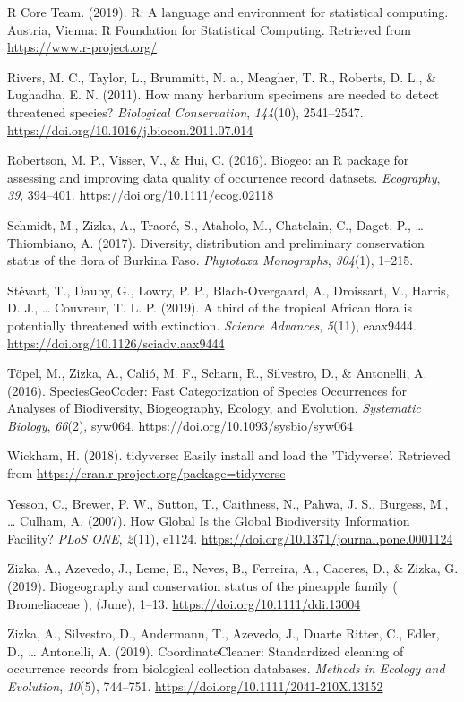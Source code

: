 \documentclass[
  12pt,
]{article}
\begin{document}
\leavevmode\hypertarget{ref-rcoreteam2019}{}%
R Core Team. (2019). R: A language and environment for statistical computing. Austria, Vienna: R Foundation for Statistical Computing. Retrieved from \url{https://www.r-project.org/}

\leavevmode\hypertarget{ref-Rivers2011}{}%
Rivers, M. C., Taylor, L., Brummitt, N. a., Meagher, T. R., Roberts, D. L., \& Lughadha, E. N. (2011). How many herbarium specimens are needed to detect threatened species? \emph{Biological Conservation}, \emph{144}(10), 2541--2547. \url{https://doi.org/10.1016/j.biocon.2011.07.014}

\leavevmode\hypertarget{ref-Robertson2016}{}%
Robertson, M. P., Visser, V., \& Hui, C. (2016). Biogeo: an R package for assessing and improving data quality of occurrence record datasets. \emph{Ecography}, \emph{39}, 394--401. \url{https://doi.org/10.1111/ecog.02118}

\leavevmode\hypertarget{ref-Schmidt2017}{}%
Schmidt, M., Zizka, A., Traoré, S., Ataholo, M., Chatelain, C., Daget, P., \ldots{} Thiombiano, A. (2017). Diversity, distribution and preliminary conservation status of the flora of Burkina Faso. \emph{Phytotaxa Monographs}, \emph{304}(1), 1--215.

\leavevmode\hypertarget{ref-Stevart2019}{}%
Stévart, T., Dauby, G., Lowry, P. P., Blach-Overgaard, A., Droissart, V., Harris, D. J., \ldots{} Couvreur, T. L. P. (2019). A third of the tropical African flora is potentially threatened with extinction. \emph{Science Advances}, \emph{5}(11), eaax9444. \url{https://doi.org/10.1126/sciadv.aax9444}

\leavevmode\hypertarget{ref-Topel2016}{}%
Töpel, M., Zizka, A., Calió, M. F., Scharn, R., Silvestro, D., \& Antonelli, A. (2016). SpeciesGeoCoder: Fast Categorization of Species Occurrences for Analyses of Biodiversity, Biogeography, Ecology, and Evolution. \emph{Systematic Biology}, \emph{66}(2), syw064. \url{https://doi.org/10.1093/sysbio/syw064}

\leavevmode\hypertarget{ref-Wickham2018}{}%
Wickham, H. (2018). tidyverse: Easily install and load the 'Tidyverse'. Retrieved from \url{https://cran.r-project.org/package=tidyverse}

\leavevmode\hypertarget{ref-Yesson2007}{}%
Yesson, C., Brewer, P. W., Sutton, T., Caithness, N., Pahwa, J. S., Burgess, M., \ldots{} Culham, A. (2007). How Global Is the Global Biodiversity Information Facility? \emph{PLoS ONE}, \emph{2}(11), e1124. \url{https://doi.org/10.1371/journal.pone.0001124}

\leavevmode\hypertarget{ref-Zizka2019a}{}%
Zizka, A., Azevedo, J., Leme, E., Neves, B., Ferreira, A., Caceres, D., \& Zizka, G. (2019). Biogeography and conservation status of the pineapple family ( Bromeliaceae ), (June), 1--13. \url{https://doi.org/10.1111/ddi.13004}

\leavevmode\hypertarget{ref-Zizka2019}{}%
Zizka, A., Silvestro, D., Andermann, T., Azevedo, J., Duarte Ritter, C., Edler, D., \ldots{} Antonelli, A. (2019). CoordinateCleaner: Standardized cleaning of occurrence records from biological collection databases. \emph{Methods in Ecology and Evolution}, \emph{10}(5), 744--751. \url{https://doi.org/10.1111/2041-210X.13152}
\end{document}
